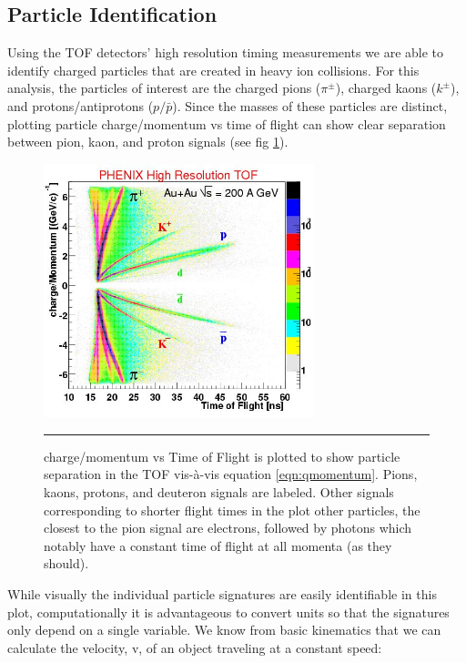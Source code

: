 \subsection{Particle Identification}
\label{sect:pidmethod}
Using the TOF detectors' high resolution timing measurements we are able to identify charged particles that are created in heavy ion collisions. For this analysis, the particles of interest are the charged pions ($\pi^{\pm}$), charged kaons ($k^{\pm}$), and protons/antiprotons ($p/\bar{p}$). Since the masses of these particles are distinct, plotting particle charge/momentum vs time of flight can show clear separation between pion, kaon, and proton signals (see fig \ref{fig:tofchargemom}). 

\begin{figure}[htbp!]
  \centering
    \includegraphics[width=0.7\textwidth]{Figures/tofchargemom.JPG}
    \rule{35em}{0.5pt}
  \caption[Particle separation in the TOF]{charge/momentum vs Time of Flight\citep{tofchargemom} is plotted to show particle separation in the TOF vis-\`a-vis equation \ref{eqn:qmomentum}. Pions, kaons, protons, and deuteron signals are labeled. Other signals corresponding to shorter flight times in the plot other particles, the closest to the pion signal are electrons, followed by photons which notably have a constant time of flight at all momenta (as they should).}
  \label{fig:tofchargemom}
\end{figure}

While visually the individual particle signatures are easily identifiable in this plot, computationally it is advantageous to convert units so that the signatures only depend on a single variable. We know from basic kinematics that we can calculate the velocity, v, of an object traveling at a constant speed:


